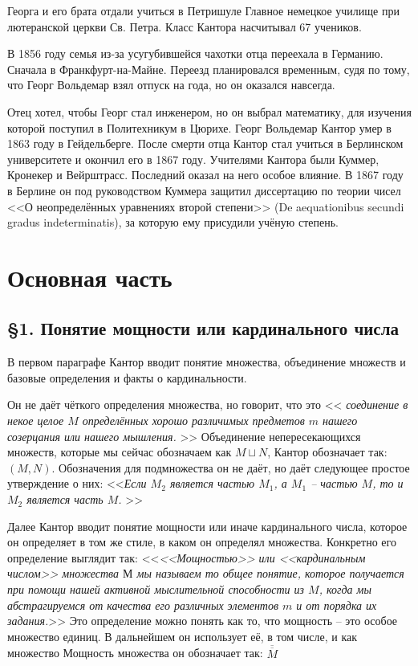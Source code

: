 \documentclass[a4paper,12pt]{extarticle}
\theoremstyle{definition}
\newcommand{\cit}[1]{<<\textit{#1}>>}
\newcommand{\car}[1]{\overline{\overline{#1}}}
\begin{document}
Георга и его брата отдали учиться в Петришуле Главное немецкое училище при лютеранской церкви Св. Петра.
Класс Кантора насчитывал 67 учеников.

В 1856 году семья из-за усугубившейся чахотки отца переехала в Германию.
Сначала в Франкфурт-на-Майне.
Переезд планировался временным, судя по тому, что Георг Вольдемар взял отпуск на года, но он оказался навсегда.

Отец хотел, чтобы Георг стал инженером, но он выбрал математику, для изучения которой поступил в Политехникум в Цюрихе.
Георг Вольдемар Кантор умер в 1863 году в Гейдельберге.
После смерти отца Кантор стал учиться в Берлинском университете и окончил его в 1867 году.
Учителями Кантора были Куммер, Кронекер и Вейрштрасс.
Последний оказал на него особое влияние.
В 1867 году в Берлине он под руководством Куммера защитил диссертацию по теории чисел
<<О неопределённых уравнениях второй степени>> (De aequationibus secundi gradus indeterminatis), за которую ему присудили учёную степень.


\section{Основная часть}
\subsection{\S 1. Понятие мощности или кардинального числа}
В первом параграфе Кантор вводит понятие множества, объединение множеств и базовые определения и факты о кардинальности.

Он не даёт чёткого определения множества, но говорит, что это \cit{
соединение в некое целое $M$ определённых хорошо различимых предметов $m$ нашего созерцания или нашего мышления.
}
Объединение непересекающихся множеств, которые мы сейчас обозначаем как $M \sqcup N$, Кантор обозначает так: $(M, N)$.
Обозначения для подмножества он не даёт, но даёт следующее простое утверждение о них:
\cit{Если $M_2$ является частью $M_1$, а $M_1$ -- частью $M$, то и $M_2$ является часть $M$.
}

Далее Кантор вводит понятие мощности или иначе кардинального числа, которое он определяет в том же стиле, в каком он определял множества.
Конкретно его определение выглядит так:
\cit{<<Мощностью>> или <<кардинальным числом>> множества $М$ мы называем то общее понятие,
которое получается при помощи нашей активной мыслительной способности из $M$,
когда мы абстрагируемся от качества его различных элементов $m$ и от порядка их задания.}
Это определение можно понять как то, что мощность -- это особое множество единиц.
В дальнейшем он использует её, в том числе, и как множество
Мощность множества он обозначает так: $\car{M}$
\end{document}
